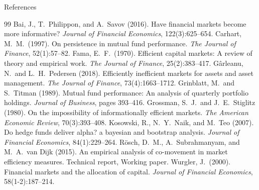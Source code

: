 \documentclass[aspectratio=169,xcolor=dvipsnames]{beamer}
\begin{document}
\begin{frame}[allowframebreaks]{References}
    \small
    \begin{thebibliography}{99}
            Bai, J., T.\ Philippon, and A.\ Savov (2016). Have financial markets become more informative? \textit{Journal of Financial Economics}, 122(3):625--654.
            Carhart, M.\ M.\ (1997). On persistence in mutual fund performance. \textit{The Journal of Finance}, 52(1):57--82.
            Fama, E.\ F.\ (1970). Efficient capital markets: A review of theory and empirical work. \textit{The Journal of Finance}, 25(2):383--417.
            G\^arleanu, N.\ and L.\ H.\ Pedersen (2018). Efficiently inefficient markets for assets and asset management. \textit{The Journal of Finance}, 73(4):1663--1712.
            Grinblatt, M.\ and S.\ Titman (1989). Mutual fund performance: An analysis of quarterly portfolio holdings. \textit{Journal of Business}, pages 393--416.
            Grossman, S.\ J.\ and J.\ E.\ Stiglitz (1980). On the impossibility of informationally efficient markets. \textit{The American Economic Review}, 70(3):393--408.
            Kosowski, R., N.\ Y.\ Naik, and M.\ Teo (2007). Do hedge funds deliver alpha? a bayesian and bootstrap analysis. \textit{Journal of Financial Economics}, 84(1):229--264.
            R\"osch, D.\ M., A.\ Subrahmanyam, and M.\ A.\ van Dijk (2015). An empirical analysis of co-movement in market efficiency measures. Technical report, Working paper.
            Wurgler, J.\ (2000). Financial markets and the allocation of capital. \textit{Journal of Financial Economics}, 58(1-2):187--214.
    \end{thebibliography}
\end{frame}
\end{document}
